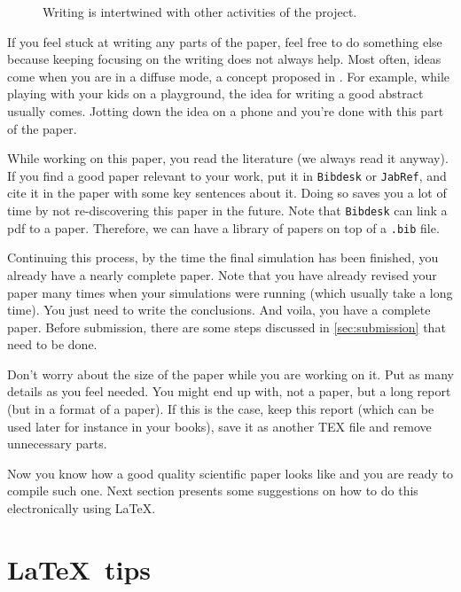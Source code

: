 \documentclass[authoryear,3p,times,preprint,review,fleqn]{elsarticle}
\numberwithin{equation}{section}
\theoremstyle{remark}
\begin{document}
 \begin{figure}[!ht]
      \centering
      \caption{Writing is intertwined with other activities of the project.}
      \label{fig:writing}
    \end{figure}

If you feel stuck at writing any parts of the paper, feel free to do something else because keeping focusing on the writing does not always help. Most often, ideas come when you are in a diffuse mode, a concept proposed in \cite{Oakley:2018a}. For example, while playing with your kids on a playground, the idea for writing a good abstract usually comes. Jotting down the idea on a phone and you're done with this part of the paper.

While working on this paper, you read the literature (we always read it anyway). If you find a good paper relevant to your work, put it in \texttt{Bibdesk} or \texttt{JabRef}, and cite it in the paper with some key sentences about it. Doing so saves you a lot of time by not re-discovering this paper in the future. Note that \texttt{Bibdesk} can link a pdf to a paper. Therefore, we can have a library of papers on top of a \texttt{.bib} file. 

Continuing this process, by the time the final simulation has been finished, you already have a nearly complete paper. Note that you have already revised your paper many times when your simulations were running (which usually take a long time).
You just need to write the conclusions. And voila, you have a complete paper. Before submission, there are some steps discussed in \cref{sec:submission} that need to be done.

Don't worry about the size of the paper while you are working on it. Put as many details as you feel needed. You might end up with, not a paper, but a long report (but in a format of a paper). If this is the case, keep this report (which can be used later for instance in your books), save it as another TEX file and remove unnecessary parts.

Now you know how a good quality scientific paper looks like and you are ready to compile such one. Next section presents some suggestions on how to do this electronically using \LaTeX. 

\section{\LaTeX\ tips}\label{sec:latex}
\end{document}
